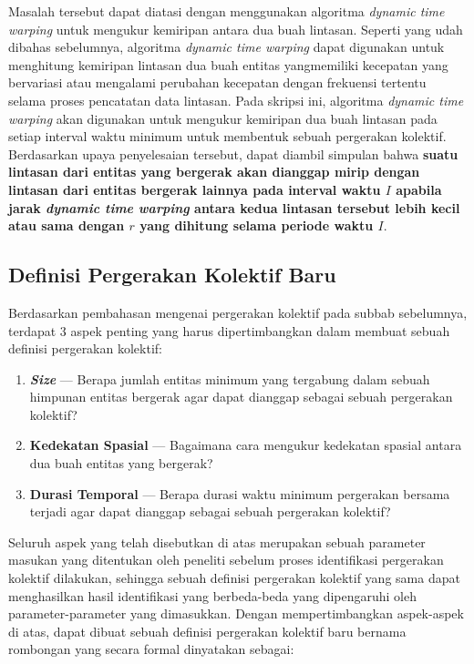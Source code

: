 \documentclass[a4paper,twoside]{article}
\begin{document}
Masalah tersebut dapat diatasi dengan menggunakan algoritma \textit{dynamic time warping} untuk mengukur kemiripan antara dua buah lintasan. Seperti yang udah dibahas sebelumnya, algoritma \textit{dynamic time warping} dapat digunakan untuk menghitung kemiripan lintasan dua buah entitas yangmemiliki kecepatan yang bervariasi atau mengalami perubahan kecepatan dengan frekuensi tertentu selama proses pencatatan data lintasan. Pada skripsi ini, algoritma \textit{dynamic time warping} akan digunakan untuk mengukur kemiripan dua buah lintasan pada setiap interval waktu minimum untuk membentuk sebuah pergerakan kolektif. Berdasarkan upaya penyelesaian tersebut, dapat diambil simpulan bahwa \textbf{suatu lintasan dari entitas yang bergerak akan dianggap mirip dengan lintasan dari entitas bergerak lainnya pada interval waktu $I$ apabila jarak \textit{dynamic time warping} antara kedua lintasan tersebut lebih kecil atau sama dengan $r$ yang dihitung selama periode waktu $I$}. 

\subsection{Definisi Pergerakan Kolektif Baru}

Berdasarkan pembahasan mengenai pergerakan kolektif pada subbab sebelumnya, terdapat 3 aspek penting yang harus dipertimbangkan dalam membuat sebuah definisi pergerakan kolektif:

\begin{enumerate}
    \item \textbf{\textit{Size}} --- Berapa jumlah entitas minimum yang tergabung dalam sebuah himpunan entitas bergerak agar dapat dianggap sebagai sebuah pergerakan kolektif?
    \item \textbf{Kedekatan Spasial} --- Bagaimana cara mengukur kedekatan spasial antara dua buah entitas yang bergerak?
    \item \textbf{Durasi Temporal} --- Berapa durasi waktu minimum pergerakan bersama terjadi agar dapat dianggap sebagai sebuah pergerakan kolektif?
\end{enumerate}

Seluruh aspek yang telah disebutkan di atas merupakan sebuah parameter masukan yang ditentukan oleh peneliti sebelum proses identifikasi pergerakan kolektif dilakukan, sehingga sebuah definisi pergerakan kolektif yang sama dapat menghasilkan hasil identifikasi yang berbeda-beda yang dipengaruhi oleh parameter-parameter yang dimasukkan. 
Dengan mempertimbangkan aspek-aspek di atas, dapat dibuat sebuah definisi pergerakan kolektif baru bernama rombongan yang secara formal dinyatakan sebagai:
\end{document}
